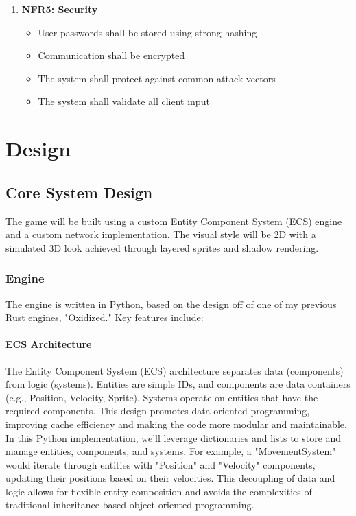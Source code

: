 \documentclass{article}
\begin{document}
\begin{enumerate}
    \item \textbf{NFR5: Security}
    \begin{itemize}
        \item User passwords shall be stored using strong hashing
        \item Communication shall be encrypted
        \item The system shall protect against common attack vectors
        \item The system shall validate all client input
    \end{itemize}
\end{enumerate}

\section{Design}

\subsection{Core System Design}

The game will be built using a custom Entity Component System (ECS) engine and a custom network implementation. The visual style will be 2D with a simulated 3D look achieved through layered sprites and shadow rendering.

\subsubsection{Engine}

The engine is written in Python, based on the design off of one of my previous Rust engines, "Oxidized." Key features include:

\paragraph{ECS Architecture}

The Entity Component System (ECS) architecture separates data (components) from logic (systems). Entities are simple IDs, and components are data containers (e.g., Position, Velocity, Sprite). Systems operate on entities that have the required components. This design promotes data-oriented programming, improving cache efficiency and making the code more modular and maintainable. In this Python implementation, we'll leverage dictionaries and lists to store and manage entities, components, and systems. For example, a "MovementSystem" would iterate through entities with "Position" and "Velocity" components, updating their positions based on their velocities. This decoupling of data and logic allows for flexible entity composition and avoids the complexities of traditional inheritance-based object-oriented programming.
\end{document}
